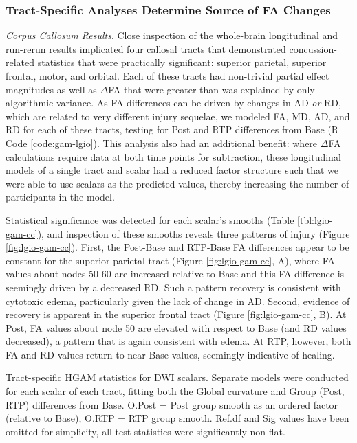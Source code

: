 \documentclass[12pt]{article}
\begin{document}
\subsubsection{Tract-Specific Analyses Determine Source of FA Changes}
\label{sssec:res-dwi-tract-tsa}
\textit{Corpus Callosum Results}. Close inspection of the whole-brain longitudinal and run-rerun results implicated four callosal tracts that demonstrated concussion-related statistics that were practically significant: superior parietal, superior frontal, motor, and orbital. Each of these tracts had non-trivial partial effect magnitudes as well as $\Delta$FA that were greater than was explained by only algorithmic variance. As FA differences can be driven by changes in AD \textit{or} RD, which are related to very different injury sequelae, we modeled FA, MD, AD, and RD for each of these tracts, testing for Post and RTP differences from Base (R Code \ref{code:gam-lgio}). This analysis also had an additional benefit: where $\Delta$FA calculations require data at both time points for subtraction, these longitudinal models of a single tract and scalar had a reduced factor structure such that we were able to use scalars as the predicted values, thereby increasing the number of participants in the model.

Statistical significance was detected for each scalar's smooths (Table \ref{tbl:lgio-gam-cc}), and inspection of these smooths reveals three patterns of injury (Figure \ref{fig:lgio-gam-cc}). First, the Post-Base and RTP-Base FA differences appear to be constant for the superior parietal tract (Figure \ref{fig:lgio-gam-cc}, A), where FA values about nodes 50-60 are increased relative to Base and this FA difference is seemingly driven by a decreased RD. Such a pattern recovery is consistent with cytotoxic edema, particularly given the lack of change in AD. Second, evidence of recovery is apparent in the superior frontal tract (Figure \ref{fig:lgio-gam-cc}, B). At Post, FA values about node 50 are elevated with respect to Base (and RD values decreased), a pattern that is again consistent with edema. At RTP, however, both FA and RD values return to near-Base values, seemingly indicative of healing.

\begin{table}[H]
	\footnotesize
	
	\caption{Tract-specific HGAM statistics for DWI scalars. Separate models were conducted for each scalar of each tract, fitting both the Global curvature and Group (Post, RTP) differences from Base. O.Post = Post group smooth as an ordered factor (relative to Base), O.RTP = RTP group smooth. Ref.df and Sig values have been omitted for simplicity, all test statistics were significantly non-flat.}
	\label{tbl:lgio-gam-cc}
\end{table}
\end{document}
